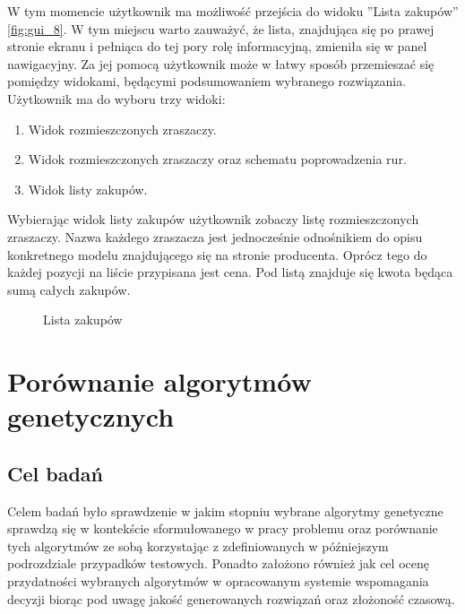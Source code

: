 \documentclass[twoside]{iisthesis}
\begin{document}
W tym momencie użytkownik ma możliwość przejścia do widoku ''Lista zakupów'' \eqref{fig:gui_8}. W tym miejscu warto zauważyć, że lista, znajdująca się po prawej stronie ekranu i pełniąca do tej pory rolę informacyjną, zmieniła się w panel nawigacyjny. Za jej pomocą użytkownik może w łatwy sposób przemieszać się pomiędzy widokami, będącymi podsumowaniem wybranego rozwiązania. Użytkownik ma do wyboru trzy widoki:\\
\begin{enumerate}
	\item Widok rozmieszczonych zraszaczy.
	\item Widok rozmieszczonych zraszaczy oraz schematu poprowadzenia rur.
	\item Widok listy zakupów.\\
\end{enumerate}

Wybierając widok listy zakupów użytkownik zobaczy listę rozmieszczonych zraszaczy. Nazwa każdego zraszacza jest jednocześnie odnośnikiem do opisu konkretnego modelu znajdującego się na stronie producenta. Oprócz tego do każdej pozycji na liście przypisana jest cena. Pod listą znajduje się kwota będąca sumą całych zakupów.
\begin{figure}[!htb]
	\centering
	\caption{Lista zakupów}
	\label{fig:gui_8}
\end{figure}
\section{Porównanie algorytmów genetycznych}
\subsection{Cel badań}
Celem badań było sprawdzenie w jakim stopniu wybrane algorytmy genetyczne sprawdzą się w kontekście sformułowanego w pracy problemu oraz porównanie tych algorytmów ze sobą korzystając z zdefiniowanych w późniejszym podrozdziale przypadków testowych. Ponadto założono również jak cel ocenę przydatności wybranych algorytmów w opracowanym systemie wspomagania decyzji biorąc pod uwagę jakość generowanych rozwiązań oraz złożoność czasową.
\end{document}

